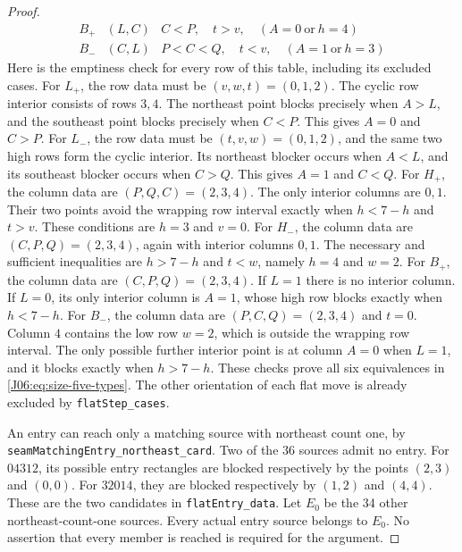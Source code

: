 \documentclass[11pt,oneside]{report}
\theoremstyle{definition}
\numberwithin{equation}{section}
\newcommand{\decl}[1]{\textnormal{\nolinkurl{#1}}}
\begin{document}
\begin{proof}
\[\begin{array}{c|c|l}
 B_+&(L,C)&C<P,\quad t>v,\quad (A=0\ \text{or}\ h=4)\\
 B_-&(C,L)&P<C<Q,\quad t<v,\quad (A=1\ \text{or}\ h=3)
\end{array}
\tag{J06.F5.1}\label{J06:eq:size-five-types}
\]
Here is the emptiness check for every row of this table, including its
excluded cases. For $L_+$, the row data must be $(v,w,t)=(0,1,2)$.
The cyclic row interior consists of rows $3,4$.
The northeast point blocks precisely when $A>L$, and the southeast
point blocks precisely when $C<P$. This gives $A=0$ and $C>P$.
For $L_-$, the row data must be $(t,v,w)=(0,1,2)$, and the same two
high rows form the cyclic interior. Its northeast blocker occurs when
$A<L$, and its southeast blocker occurs when $C>Q$.
This gives $A=1$ and $C<Q$.
For $H_+$, the column data are $(P,Q,C)=(2,3,4)$.
The only interior columns are $0,1$. Their two points avoid the
wrapping row interval exactly when $h<7-h$ and $t>v$.
These conditions are $h=3$ and $v=0$.
For $H_-$, the column data are $(C,P,Q)=(2,3,4)$, again with interior
columns $0,1$. The necessary and sufficient inequalities are
$h>7-h$ and $t<w$, namely $h=4$ and $w=2$.
For $B_+$, the column data are $(C,P,Q)=(2,3,4)$.
If $L=1$ there is no interior column. If $L=0$, its only interior
column is $A=1$, whose high row blocks exactly when $h<7-h$.
For $B_-$, the column data are $(P,C,Q)=(2,3,4)$ and $t=0$.
Column $4$ contains the low row $w=2$, which is outside the wrapping
row interval. The only possible further interior point is at column
$A=0$ when $L=1$, and it blocks exactly when $h>7-h$.
These checks prove all six equivalences in
\eqref{J06:eq:size-five-types}. The other orientation of each flat move
is already excluded by \decl{flatStep_cases}.

An entry can reach only a matching source with northeast count one,
by \decl{seamMatchingEntry_northeast_card}.
Two of the 36 sources admit no entry. For $04312$, its possible entry
rectangles are blocked respectively by the points $(2,3)$ and $(0,0)$.
For $32014$, they are blocked respectively by $(1,2)$ and $(4,4)$.
These are the two candidates in \decl{flatEntry_data}.
Let $E_0$ be the 34 other northeast-count-one sources.
Every actual entry source belongs to $E_0$. No assertion that every
member is reached is required for the argument.


\end{proof}
\end{document}
